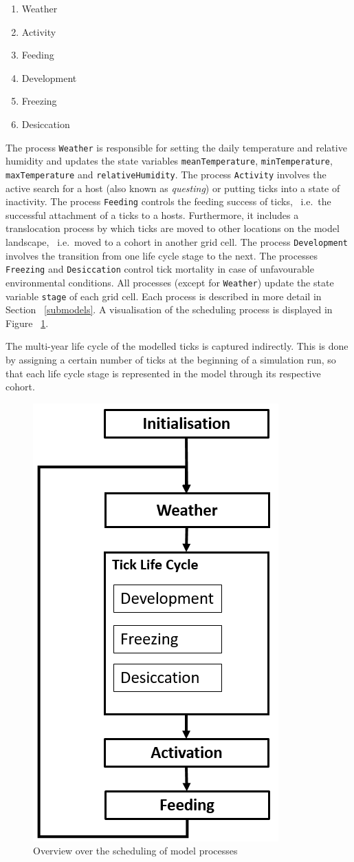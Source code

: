 \documentclass[a4paper, 11pt]{scrartcl}
\newcommand{\inlinecode}[1]{\texttt{\small #1}}
\begin{document}
\begin{enumerate}
	\item Weather
	\item Activity
	\item Feeding
	\item Development
	\item Freezing
	\item Desiccation
\end{enumerate}

The process \inlinecode{Weather} is responsible for setting the daily temperature and relative humidity and updates the state variables \inlinecode{meanTemperature}, \inlinecode{minTemperature}, \inlinecode{maxTemperature} and \inlinecode{relativeHumidity}. The process \inlinecode{Activity} involves the active search for a host (also known as \textit{questing}) or putting ticks into a state of inactivity. The process \inlinecode{Feeding} controls the feeding success of ticks, ~i.e.\ the successful attachment of a ticks to a hosts. Furthermore, it includes a translocation process by which ticks are moved to other locations on the model landscape, ~i.e.\ moved to a cohort in another grid cell. The process \inlinecode{Development} involves the transition from one life cycle stage to the next. The processes \inlinecode{Freezing} and \inlinecode{Desiccation} control tick mortality in case of unfavourable environmental conditions. All processes (except for \inlinecode{Weather}) update the state variable \inlinecode{stage} of each grid cell. Each process is described in more detail in Section ~\ref{submodels}. A visualisation of the scheduling process is displayed in Figure ~\ref{fig:iris_scheduling}.

The multi-year life cycle of the modelled ticks is captured indirectly. This is done by assigning a certain number of ticks at the beginning of a simulation run, so that each life cycle stage is represented in the model through its respective cohort.

\begin{figure}[h!]
	\centering
	\includegraphics[width=0.3\linewidth]{figures/IRIS_scheduling.PNG}
	\caption{Overview over the scheduling of model processes}
	\label{fig:iris_scheduling}
\end{figure}
\end{document}
